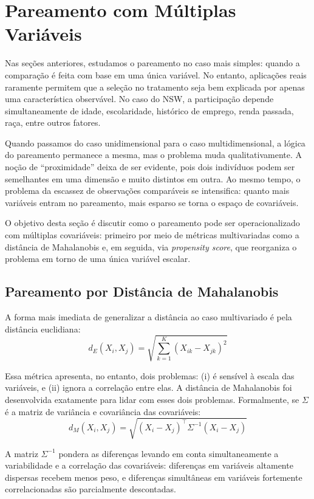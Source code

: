 \documentclass[12pt,a4paper]{article}
\begin{document}
\newpage
\section{Pareamento com Múltiplas Variáveis}\label{sec:multivariado}

Nas seções anteriores, estudamos o pareamento no caso mais simples: quando a comparação é feita com base em uma única variável. No entanto, aplicações reais raramente permitem que a seleção no tratamento seja bem explicada por apenas uma característica observável. No caso do NSW, a participação depende simultaneamente de idade, escolaridade, histórico de emprego, renda passada, raça, entre outros fatores.

Quando passamos do caso unidimensional para o caso multidimensional, a lógica do pareamento permanece a mesma, mas o problema muda qualitativamente. A noção de ``proximidade'' deixa de ser evidente, pois dois indivíduos podem ser semelhantes em uma dimensão e muito distintos em outra. Ao mesmo tempo, o problema da escassez de observações comparáveis se intensifica: quanto mais variáveis entram no pareamento, mais esparso se torna o espaço de covariáveis.

O objetivo desta seção é discutir como o pareamento pode ser operacionalizado com múltiplas covariáveis: primeiro por meio de métricas multivariadas como a distância de Mahalanobis e, em seguida, via \textit{propensity score}, que reorganiza o problema em torno de uma única variável escalar.

\subsection{Pareamento por Distância de Mahalanobis}

A forma mais imediata de generalizar a distância ao caso multivariado é pela distância euclidiana:
\[
d_E(X_i, X_j)
=
\sqrt{\sum_{k=1}^K (X_{ik} - X_{jk})^2}
\]

Essa métrica apresenta, no entanto, dois problemas: (i) é sensível à escala das variáveis, e (ii) ignora a correlação entre elas. A distância de Mahalanobis foi desenvolvida exatamente para lidar com esses dois problemas. Formalmente, se $\Sigma$ é a matriz de variância e covariância das covariáveis:
\[
d_M(X_i, X_j)
=
\sqrt{(X_i - X_j)^\top \Sigma^{-1} (X_i - X_j)}
\]

A matriz $\Sigma^{-1}$ pondera as diferenças levando em conta simultaneamente a variabilidade e a correlação das covariáveis: diferenças em variáveis altamente dispersas recebem menos peso, e diferenças simultâneas em variáveis fortemente correlacionadas são parcialmente descontadas.
\end{document}
